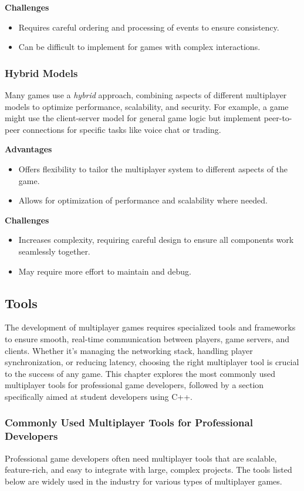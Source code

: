 \documentclass{article} %
\begin{document}
\textbf{Challenges}
\begin{itemize}
	\item Requires careful ordering and processing of events to ensure consistency.
	\item Can be difficult to implement for games with complex interactions.
\end{itemize}

\subsubsection{Hybrid Models}
Many games use a \textit{hybrid} approach, combining aspects of different multiplayer models to optimize performance, scalability, and security. For example, a game might use the client-server model for general game logic but implement peer-to-peer connections for specific tasks like voice chat or trading.

\textbf{Advantages}
\begin{itemize}
	\item Offers flexibility to tailor the multiplayer system to different aspects of the game.
	\item Allows for optimization of performance and scalability where needed.
\end{itemize}

\textbf{Challenges}
\begin{itemize}
	\item Increases complexity, requiring careful design to ensure all components work seamlessly together.
	\item May require more effort to maintain and debug.
\end{itemize}

\subsection{Tools}
The development of multiplayer games requires specialized tools and frameworks to ensure smooth,
real-time communication between players, game servers, and clients. Whether it's managing the networking stack, handling player synchronization, or reducing latency,
choosing the right multiplayer tool is crucial to the success of any game. This chapter explores the most commonly used multiplayer tools for professional game developers,
followed by a section specifically aimed at student developers using C++.

\subsubsection{Commonly Used Multiplayer Tools for Professional Developers}
Professional game developers often need multiplayer tools that are scalable, feature-rich, and easy to integrate with large, complex projects. The tools listed below are widely used in the industry for various types of multiplayer games.
\end{document}
